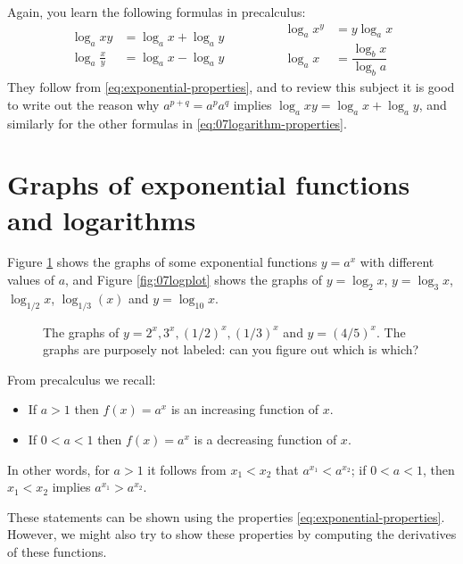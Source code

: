 Again, you learn the following formulas in precalculus:
\begin{equation}
  \begin{aligned}
    \log_a xy &= \log_a x + \log _a y \\
    \log_a \frac xy &= \log_ax-\log_a y
  \end{aligned}
  \qquad\qquad
  \begin{aligned}
    \log_a x^y &= y\log_a x \\
    \log_a x &= \dfrac{\log_b x}{\log_b a}
  \end{aligned}
  \label{eq:07logarithm-properties}
\end{equation}
They follow from \eqref{eq:exponential-properties}, and to review this
subject it is good to write out the reason why $a^{p+q} = a^p a^q$
implies $\log_a xy = \log_a x + \log_a y$, and similarly for the other
formulas in \eqref{eq:07logarithm-properties}.




\section{Graphs of exponential functions and logarithms} %
Figure \ref{fig:07expplot} shows the graphs of some exponential
functions $y=a^x$ with different values of $a$, and Figure
\ref{fig:07logplot} shows the graphs of $y=\log_2 x$, $y=\log_3 x$,
$\log_{1/2}x$, $\log_{1/3}(x)$ and $y=\log_{10}x$.




\begin{figure}[t]\centering
  
  \caption{The graphs of $y=2^x, 3^x, (1/2)^x, (1/3)^x$ and $y=(4/5)^x$.
    The graphs are purposely not labeled: can you figure out which is which?}
  \label{fig:07expplot}
\end{figure}




From precalculus we recall:
\begin{itemize}
\item If $a>1$ then $f(x)=a^x$ is an increasing function of $x$.
\item If $0<a<1$ then $f(x)=a^x$ is a decreasing function of $x$.
\end{itemize}
In other words, for $a>1$ it follows from $x_1<x_2$ that
$a^{x_1}<a^{x_2}$; if $0<a<1$, then $x_1<x_2$ implies $a^{x_1} >
a^{x_2}$.

These statements can be shown using the properties \ref{eq:exponential-properties}.  However, we might also try to show these properties by computing the derivatives of these functions.


